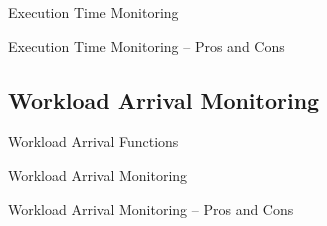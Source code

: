 \begin{frame}{Execution Time Monitoring}

\end{frame}


\begin{frame}{Execution Time Monitoring -- Pros and Cons}

\end{frame}


\subsection{Workload Arrival Monitoring}

\begin{frame}{Workload Arrival Functions}

\end{frame}

\begin{frame}{Workload Arrival Monitoring}

\end{frame}


\begin{frame}{Workload Arrival Monitoring -- Pros and Cons}

\end{frame}

